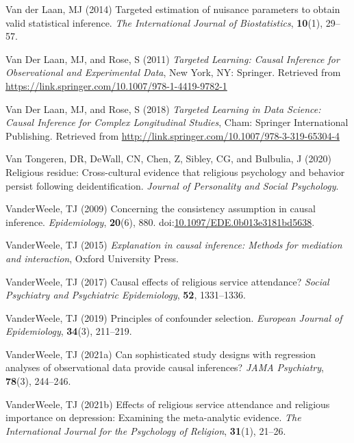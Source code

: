\documentclass[
  single column]{article}
\newlength{\cslhangindent}
\newenvironment{CSLReferences}[2] %
 {\begin{list}{}{%
  \setlength{\itemindent}{0pt}
  \setlength{\leftmargin}{0pt}
  \setlength{\parsep}{0pt}
  \ifodd #1
   \setlength{\leftmargin}{\cslhangindent}
   \setlength{\itemindent}{-1\cslhangindent}
  \fi
  \setlength{\itemsep}{#2\baselineskip}}}
 {\end{list}}
\begin{document}
\begin{CSLReferences}{1}{0}
Van der Laan, MJ (2014) Targeted estimation of nuisance parameters to
obtain valid statistical inference. \emph{The International Journal of
Biostatistics}, \textbf{10}(1), 29--57.

Van Der Laan, MJ, and Rose, S (2011) \emph{Targeted Learning: Causal
Inference for Observational and Experimental Data}, New York, NY:
Springer. Retrieved from
\url{https://link.springer.com/10.1007/978-1-4419-9782-1}

Van Der Laan, MJ, and Rose, S (2018) \emph{Targeted Learning in Data
Science: Causal Inference for Complex Longitudinal Studies}, Cham:
Springer International Publishing. Retrieved from
\url{http://link.springer.com/10.1007/978-3-319-65304-4}

Van Tongeren, DR, DeWall, CN, Chen, Z, Sibley, CG, and Bulbulia, J
(2020) Religious residue: Cross-cultural evidence that religious
psychology and behavior persist following deidentification.
\emph{Journal of Personality and Social Psychology}.

VanderWeele, TJ (2009) Concerning the consistency assumption in causal
inference. \emph{Epidemiology}, \textbf{20}(6), 880.
doi:\href{https://doi.org/10.1097/EDE.0b013e3181bd5638}{10.1097/EDE.0b013e3181bd5638}.

VanderWeele, TJ (2015) \emph{Explanation in causal inference: Methods
for mediation and interaction}, Oxford University Press.

VanderWeele, TJ (2017) Causal effects of religious service attendance?
\emph{Social Psychiatry and Psychiatric Epidemiology}, \textbf{52},
1331--1336.

VanderWeele, TJ (2019) Principles of confounder selection.
\emph{European Journal of Epidemiology}, \textbf{34}(3), 211--219.

VanderWeele, TJ (2021a) Can sophisticated study designs with regression
analyses of observational data provide causal inferences? \emph{JAMA
Psychiatry}, \textbf{78}(3), 244--246.

VanderWeele, TJ (2021b) Effects of religious service attendance and
religious importance on depression: Examining the meta-analytic
evidence. \emph{The International Journal for the Psychology of
Religion}, \textbf{31}(1), 21--26.


\end{CSLReferences}
\end{document}
